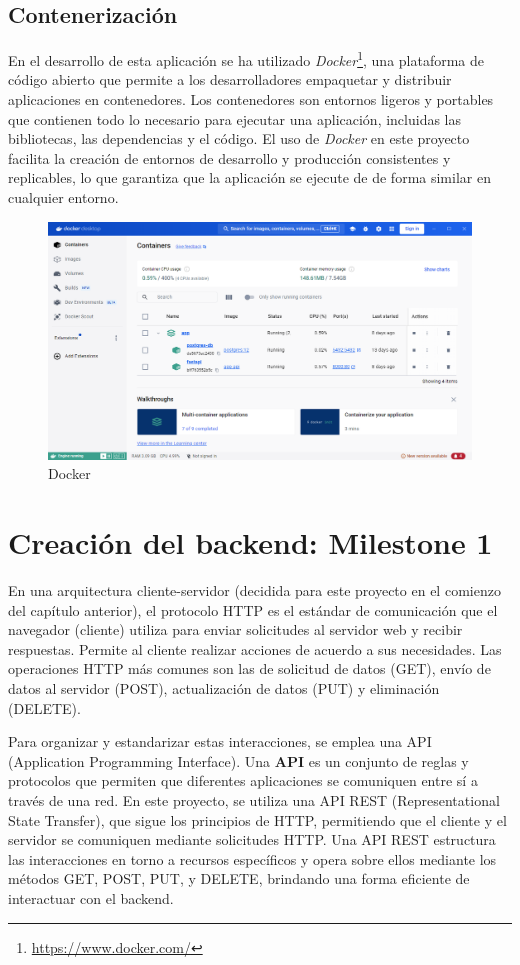 \subsection{Contenerización}
En el desarrollo de esta aplicación se ha utilizado \textit{Docker}\footnote{\url{https://www.docker.com/}}, una plataforma de código abierto que permite a los desarrolladores empaquetar y distribuir aplicaciones en contenedores. Los contenedores son entornos ligeros y portables que contienen todo lo necesario para ejecutar una aplicación, incluidas las bibliotecas, las dependencias y el código. El uso de \textit{Docker} en este proyecto facilita la creación de entornos de desarrollo y producción consistentes y replicables, lo que garantiza que la aplicación se ejecute de de forma similar en cualquier entorno.
\begin{figure}[ht!]
    \centering
    \includegraphics[width=\linewidth]{imagenes/docker.png}
    \caption{Docker}
    \label{fig:docker}
\end{figure}


\section{Creación del backend: Milestone 1}
En una arquitectura cliente-servidor (decidida para este proyecto en el comienzo del capítulo anterior), el protocolo HTTP es el estándar de comunicación que el navegador (cliente) utiliza para enviar solicitudes al servidor web y recibir respuestas. Permite al cliente realizar acciones de acuerdo a sus necesidades. Las operaciones HTTP más comunes son las de solicitud de datos (GET), envío de datos al servidor (POST), actualización de datos (PUT) y eliminación (DELETE). 

Para organizar y estandarizar estas interacciones, se emplea una API (Application Programming Interface). Una \textbf{API} es un conjunto de reglas y protocolos que permiten que diferentes aplicaciones se comuniquen entre sí a través de una red. En este proyecto, se utiliza una API REST (Representational State Transfer), que sigue los principios de HTTP, permitiendo que el cliente y el servidor se comuniquen mediante solicitudes HTTP. Una API REST estructura las interacciones en torno a recursos específicos y opera sobre ellos mediante los métodos GET, POST, PUT, y DELETE, brindando una forma eficiente de interactuar con el backend.

